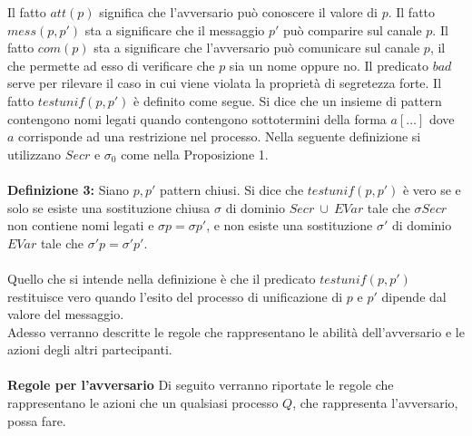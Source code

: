 \documentclass[12pt]{article}
\begin{document}
Il fatto $att(p)$ significa che l'avversario può conoscere il valore di $p$. Il fatto $mess(p,p')$ sta a significare che il messaggio $p'$ può comparire sul canale $p$. Il fatto $com(p)$ sta a significare che l'avversario può comunicare sul canale $p$, il che permette ad esso di verificare che $p$ sia un nome oppure no. Il predicato $bad$ serve per rilevare il caso in cui viene violata la proprietà di segretezza forte. Il fatto $testunif(p,p')$ è definito come segue. Si dice che un insieme di pattern contengono nomi legati quando contengono sottotermini della forma $a[\dots]$ dove $a$ corrisponde ad una restrizione nel processo. Nella seguente definizione si utilizzano $Secr$ e $\sigma_0$ come nella Proposizione 1.\\
\\
\textbf{Definizione 3:} Siano $p,p'$ pattern chiusi. Si dice che $testunif(p,p')$ è vero se e solo se esiste una sostituzione chiusa $\sigma$ di dominio $Secr\ \cup \ EVar $ tale che $\sigma Secr$ non contiene nomi legati e $\sigma p = \sigma p'$, e non esiste una sostituzione $\sigma'$ di dominio $EVar$ tale che $\sigma' p = \sigma' p'$.\\
\\
Quello che si intende nella definizione è che il predicato $testunif(p,p')$ restituisce vero quando l'esito del processo di unificazione di $p$ e $p'$ dipende dal valore del messaggio.\\
Adesso verranno descritte le regole che rappresentano le abilità dell'avversario e le azioni degli altri partecipanti.\\
\\
\textbf{Regole per l'avversario } Di seguito verranno riportate le regole che rappresentano le azioni che un qualsiasi processo $Q$, che rappresenta l'avversario, possa fare.\\
\end{document}
